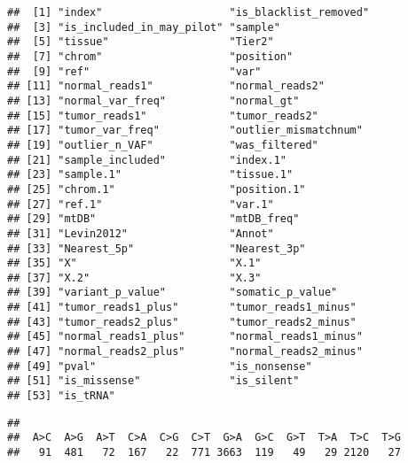 \documentclass[
]{article}
\newenvironment{Shaded}{\begin{snugshade}}{\end{snugshade}}
\newcommand{\CommentTok}[1]{\textcolor[rgb]{0.56,0.35,0.01}{\textit{#1}}}
\newcommand{\DataTypeTok}[1]{\textcolor[rgb]{0.13,0.29,0.53}{#1}}
\newcommand{\KeywordTok}[1]{\textcolor[rgb]{0.13,0.29,0.53}{\textbf{#1}}}
\newcommand{\NormalTok}[1]{#1}
\newcommand{\OperatorTok}[1]{\textcolor[rgb]{0.81,0.36,0.00}{\textbf{#1}}}
\newcommand{\StringTok}[1]{\textcolor[rgb]{0.31,0.60,0.02}{#1}}
\begin{document}
\begin{verbatim}
##  [1] "index"                    "is_blacklist_removed"    
##  [3] "is_included_in_may_pilot" "sample"                  
##  [5] "tissue"                   "Tier2"                   
##  [7] "chrom"                    "position"                
##  [9] "ref"                      "var"                     
## [11] "normal_reads1"            "normal_reads2"           
## [13] "normal_var_freq"          "normal_gt"               
## [15] "tumor_reads1"             "tumor_reads2"            
## [17] "tumor_var_freq"           "outlier_mismatchnum"     
## [19] "outlier_n_VAF"            "was_filtered"            
## [21] "sample_included"          "index.1"                 
## [23] "sample.1"                 "tissue.1"                
## [25] "chrom.1"                  "position.1"              
## [27] "ref.1"                    "var.1"                   
## [29] "mtDB"                     "mtDB_freq"               
## [31] "Levin2012"                "Annot"                   
## [33] "Nearest_5p"               "Nearest_3p"              
## [35] "X"                        "X.1"                     
## [37] "X.2"                      "X.3"                     
## [39] "variant_p_value"          "somatic_p_value"         
## [41] "tumor_reads1_plus"        "tumor_reads1_minus"      
## [43] "tumor_reads2_plus"        "tumor_reads2_minus"      
## [45] "normal_reads1_plus"       "normal_reads1_minus"     
## [47] "normal_reads2_plus"       "normal_reads2_minus"     
## [49] "pval"                     "is_nonsense"             
## [51] "is_missense"              "is_silent"               
## [53] "is_tRNA"
\end{verbatim}

\begin{Shaded}
\end{Shaded}

\begin{verbatim}
## 
##  A>C  A>G  A>T  C>A  C>G  C>T  G>A  G>C  G>T  T>A  T>C  T>G 
##   91  481   72  167   22  771 3663  119   49   29 2120   27
\end{verbatim}
\end{document}
